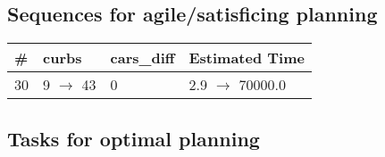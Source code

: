 \documentclass{article}
\begin{document}
                         \subsection*{Sequences for agile/satisficing planning}

                        \begin{center}
                        \begin{tabular}{@{}l|l|l|l@{}}
                        \# & curbs & cars\_diff & Estimated Time\\\midrule
                        30&9 $\rightarrow$ 43&0&2.9 $\rightarrow$ 70000.0
                        \end{tabular}
                        \end{center}
                    
                                \subsection*{Tasks for optimal planning}
                                
\end{document}
